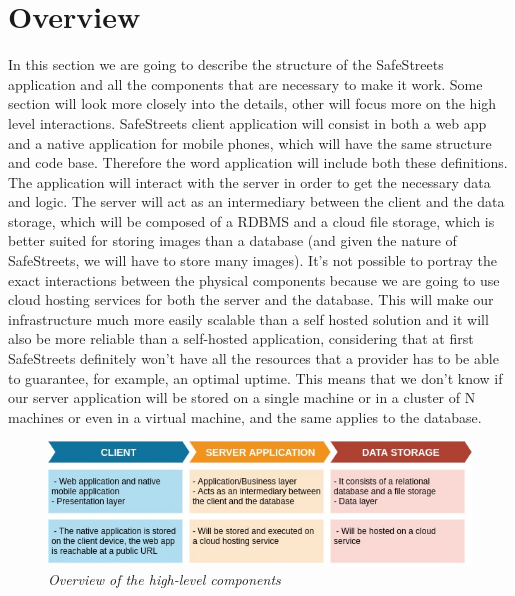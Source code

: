\section{Overview}
In this section we are going to describe the structure of the SafeStreets application and all the components that are necessary to make it work. Some section will look more closely into the details, other will focus more on the high level interactions.
\newline
SafeStreets client application will consist in both a web app and a native application for mobile phones, which will have the same structure and code base. Therefore the word application will include both these definitions.
\newline
\newline
The application will interact with the server in order to get the necessary data and logic. 
The server will act as an intermediary between the client and the data storage, which will be composed of a RDBMS and a cloud file storage, which is better suited for storing images than a database (and given the nature of SafeStreets, we will have to store many images).
\newline
\newline
It's not possible to portray the exact interactions between the physical components because we are going to use cloud hosting services for both the server and the database. 
This will make our infrastructure much more easily scalable than a self hosted solution and it will also be more reliable than a self-hosted application, considering that at first SafeStreets definitely won't have all the resources that a provider has to be able to guarantee, for example, an optimal uptime.
This means that we don't know if our server application will be stored on a single machine or in a cluster of N machines or even in a virtual machine, and the same applies to the database.

\begin{figure}[H]
  \centering
  \includegraphics[origin=c,width=\textwidth]{DD_Images/Overview.jpg}
  \caption{\textit{Overview of the high-level components}}
\end{figure}